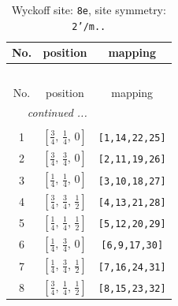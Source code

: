 \documentclass[fleqn,8pt]{jsarticle}
\begin{document}
\renewcommand{\arraystretch}{1.2}
\begin{longtable}{ccc}
\caption{Wyckoff site: {\tt 8e}, site symmetry: {\tt 2'/m..}}
 \\
 \hline \hline
No. & position & mapping \\ \hline \endfirsthead

\multicolumn{2}{l}{\tablename\ \thetable{}} \\
 \hline \hline
No. & position & mapping \\ \hline \endhead

 \hline \hline
\multicolumn{2}{r}{\footnotesize\it continued ...} \\ \endfoot

 \hline \hline
\multicolumn{2}{r}{} \\ \endlastfoot

1 & $\left[ \frac{3}{4},\, \frac{1}{4},\, 0 \right]$ & {\tt [1,14,22,25]} \\ \hline
2 & $\left[ \frac{3}{4},\, \frac{3}{4},\, 0 \right]$ & {\tt [2,11,19,26]} \\ \hline
3 & $\left[ \frac{1}{4},\, \frac{1}{4},\, 0 \right]$ & {\tt [3,10,18,27]} \\ \hline
4 & $\left[ \frac{3}{4},\, \frac{3}{4},\, \frac{1}{2} \right]$ & {\tt [4,13,21,28]} \\ \hline
5 & $\left[ \frac{1}{4},\, \frac{1}{4},\, \frac{1}{2} \right]$ & {\tt [5,12,20,29]} \\ \hline
6 & $\left[ \frac{1}{4},\, \frac{3}{4},\, 0 \right]$ & {\tt [6,9,17,30]} \\ \hline
7 & $\left[ \frac{1}{4},\, \frac{3}{4},\, \frac{1}{2} \right]$ & {\tt [7,16,24,31]} \\ \hline
8 & $\left[ \frac{3}{4},\, \frac{1}{4},\, \frac{1}{2} \right]$ & {\tt [8,15,23,32]} \\
\end{longtable}
\renewcommand{\arraystretch}{1.2}
\end{document}
